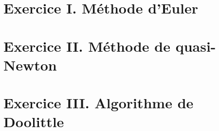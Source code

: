 

\section*{Exercice I. Méthode d'Euler}

\section*{Exercice II. Méthode de quasi-Newton}

\section*{Exercice III. Algorithme de Doolittle}

